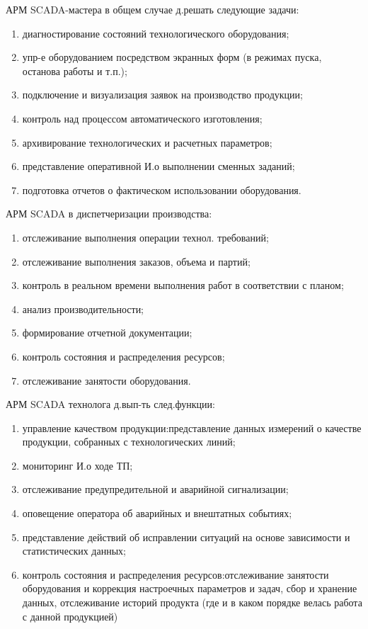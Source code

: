 \documentclass[unicode, 12pt, a4paper, oneside]{article}
\begin{document}
АРМ SCADA-мастера в общем случае д.решать следующие задачи:
\begin{enumerate}
\item диагностирование состояний технологического оборудования;
\item упр-е оборудованием посредством экранных форм (в режимах пуска, останова работы и т.п.);
\item подключение и визуализация заявок на производство продукции;
\item контроль над процессом автоматического изготовления;
\item архивирование технологических и расчетных параметров;
\item представление оперативной И.о выполнении сменных заданий;
\item подготовка отчетов о фактическом использовании оборудования.
\end{enumerate}
АРМ SCADA в диспетчеризации производства:
\begin{enumerate}
\item	отслеживание выполнения операции технол. требований;
\item	отслеживание выполнения заказов, объема и партий;
\item	контроль в реальном времени выполнения работ в соответствии с планом;
\item	анализ производительности;
\item	формирование отчетной документации;
\item	контроль состояния и распределения ресурсов;
\item	отслеживание занятости оборудования.
\end{enumerate}
АРМ SCADA технолога д.вып-ть след.функции:
\begin{enumerate}
\item управление качеством продукции:представление данных измерений о качестве продукции, собранных с технологических линий;
\item мониторинг И.о ходе ТП;
\item отслеживание предупредительной и аварийной сигнализации;
\item оповещение оператора об аварийных и внештатных событиях;
\item представление действий об исправлении ситуаций на основе зависимости и статистических данных;
\item контроль состояния и распределения ресурсов:отслеживание занятости оборудования и коррекция настроечных параметров и задач, сбор и хранение данных, отслеживание историй продукта (где и в каком порядке велась работа с данной продукцией)
\end{enumerate}
\end{document}

